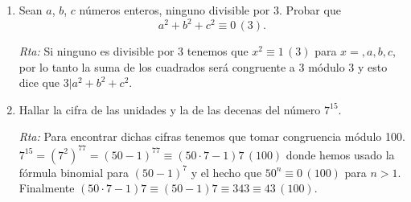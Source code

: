 \documentclass[12pt,spanish,makeidx]{amsbook}
\newcommand{\rta}{\noindent\textit{Rta: }}
\newcommand{\md}[1]{{\,}\left(#1\right)}
\begin{document}
\begin{enumerate}
\begin{enumerate}
		\textit{Regla del 2.} Si $n=\sum_{j=0}^ka_j10^j, n\equiv \sum_{j=1}^ka_j0^j+a_0 \md{2}$ por lo tanto es divisible por 2 si y solo si su dígito de unidades lo es, o sea si termina en 0, 2, 4, 6, 8.
		
		\textit{Regla del 3 y 9.} Como $10\equiv 1\md{3}, \sum_{j=0}^ka_j10^j\equiv\sum_{j=0}^ka_j1^j \md{3}$. Por lo tanto $3\vert n$ si y sólo si 3 divide a la suma de sus dígitos.
		Notar que lo mismo pasa con 9 por ser $10\equiv 1\md{9}$.
		
		\textit{Regla del 4 y 8.} $10^j\equiv0 \md{4}$ si $j>1$ y $10^j\equiv0 \md{8}$ si $j>2$. Por lo tanto, al tomar congruencia de $n$ módulo 4 u 8, sólo quedan las dos últimas cifras en el primer caso y las 3 últimas en el segundo. Es decir $4\vert n$ si y sólo si $4\vert 10a_1 +a_0$ y $8\vert n$ si y sólo si $8\vert 100a_2+10a_1 +a_0$ .
		
		\textit{Regla del 11.} $10\equiv -1\md{11} \Rightarrow n=\sum_{j=0}^ka_j10^j\equiv \sum_{j=0}^ka_j(-1)^j$ Entonces $11\vert n$ si y sólo si 11 divide a la suma de los dígitos que están en lugar par menos la suma delos dígitos que están en lugar impar.
		
		
		
		
		\item Decir por cuáles de los números del 2 al 11 son divisibles los siguientes números:
		$$ \qquad 12342  \, \qquad   \qquad  5176 \, \qquad \qquad  314573\,  \qquad  \qquad  899.$$
			
		\rta  $12342 =2\cdot 3 \cdot 11^2\cdot 17$,  $5176=2^3 \cdot 647$, $314573= 7\cdot 44939$, $899$ no es divisible por ninguno de ellos.
		
	\end{enumerate}
	
	
	\smallskip
	\item Sean $a$, $b$, $c$ números enteros, ninguno divisible por 3. Probar que 
	$$a^2 + b^2 + c^2\equiv 0 \md 3.$$%
		
	\rta Si ninguno es divisible por 3 tenemos que $x^2\equiv1\md{3}$ para $x=,a,b,c$, por lo tanto la suma de los cuadrados será congruente a 3 módulo 3 y esto dice que $3\vert a^2+b^2+c^2$.
	
	
	\smallskip
	\item Hallar la cifra de las unidades y la de las decenas del número $7^{15}$.
		
	\rta Para encontrar dichas cifras tenemos que tomar congruencia módulo 100.
	$7^{15}=(7^2)^77=(50-1)^77\equiv (50\cdot7-1)7 \md{100}$ donde hemos usado la fórmula binomial para $(50-1)^7$ y el hecho que $50^n\equiv 0 \md{100}$ para $n>1$. Finalmente $(50\cdot7-1)7\equiv (50-1)7\equiv 343\equiv43\md{100}$.
	

\end{enumerate}
\end{document}
